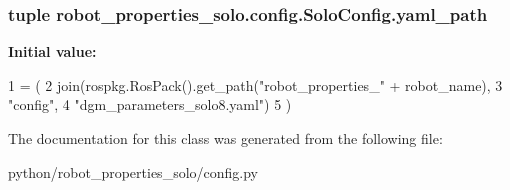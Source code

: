 \subsubsection[{\texorpdfstring{yaml\+\_\+path}{yaml_path}}]{\setlength{\rightskip}{0pt plus 5cm}tuple robot\+\_\+properties\+\_\+solo.\+config.\+Solo\+Config.\+yaml\+\_\+path\hspace{0.3cm}{\ttfamily [static]}}\hypertarget{classrobot__properties__solo_1_1config_1_1SoloConfig_ace186b0b03d0de17972faf5c5c25d929}{}\label{classrobot__properties__solo_1_1config_1_1SoloConfig_ace186b0b03d0de17972faf5c5c25d929}
{\bfseries Initial value\+:}
\begin{DoxyCode}
1 = (
2         join(rospkg.RosPack().get\_path(\textcolor{stringliteral}{"robot\_properties\_"} + robot\_name),
3              \textcolor{stringliteral}{"config"},
4              \textcolor{stringliteral}{"dgm\_parameters\_solo8.yaml"})
5     )
\end{DoxyCode}


The documentation for this class was generated from the following file\+:\begin{DoxyCompactItemize}
\item 
python/robot\+\_\+properties\+\_\+solo/config.\+py\end{DoxyCompactItemize}
